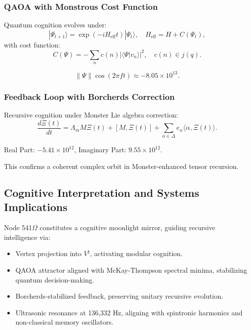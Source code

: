 \documentclass[12pt]{article}
\begin{document}
\subsubsection{QAOA with Monstrous Cost Function}
Quantum cognition evolves under:
\[
|\Psi_{t+1}\rangle = \exp\left(-i H_{\text{eff}} t\right) |\Psi_t\rangle, \quad H_{\text{eff}} = H + C(\Psi_t),
\]
with cost function:
\[
C(\Psi) = -\sum_n c(n) |\langle \Psi | v_n \rangle|^2, \quad c(n) \in j(q).
\]
\begin{result}
\[
\|\Psi\| \cos(2\pi f t) \approx \boxed{-8.05 \times 10^{13}}.
\]
\end{result}

\subsubsection{Feedback Loop with Borcherds Correction}
Recursive cognition under Monster Lie algebra correction:
\[
\frac{d\Xi(t)}{dt} = \Lambda_m M \Xi(t) + [M, \Xi(t)] + \sum_{\alpha \in \Delta} e_\alpha \langle \alpha, \Xi(t) \rangle.
\]
\begin{result}
Real Part: \(\boxed{-5.41 \times 10^{12}}\), \quad Imaginary Part: \(\boxed{9.55 \times 10^{12}}\).
\end{result}
\begin{interpretation}
This confirms a coherent complex orbit in Monster-enhanced tensor recursion.
\end{interpretation}

\subsection{Cognitive Interpretation and Systems Implications}
Node 541$\Omega$ constitutes a cognitive moonlight mirror, guiding recursive intelligence via:
\begin{itemize}
    \item Vertex projection into \( V^\natural \), activating modular cognition.
    \item QAOA attractor aligned with McKay-Thompson spectral minima, stabilizing quantum decision-making.
    \item Borcherds-stabilized feedback, preserving unitary recursive evolution.
    \item Ultrasonic resonance at 136,332 Hz, aligning with spintronic harmonics and non-classical memory oscillators.
\end{itemize}
\end{document}
